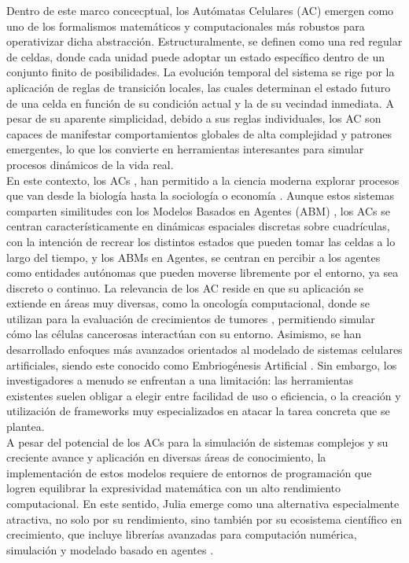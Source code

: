 \documentclass[runningheads]{llncs}
\begin{document}
Dentro de este marco concecptual, los Autómatas Celulares (AC) emergen como uno de los formalismos matemáticos y computacionales más robustos para operativizar dicha abstracción. Estructuralmente, se definen como una red regular de celdas, donde cada unidad puede adoptar un estado específico dentro de un conjunto finito de posibilidades. La evolución temporal del sistema se rige por la aplicación de reglas de transición locales, las cuales determinan el estado futuro de una celda en función de su condición actual y la de su vecindad inmediata. A pesar de su aparente simplicidad, debido a sus reglas individuales, los AC son capaces de manifestar comportamientos globales de alta complejidad y patrones emergentes, lo que los convierte en herramientas interesantes para simular procesos dinámicos de la vida real.\\

En este contexto, los ACs \cite{ref_ca}, han permitido a la ciencia moderna explorar procesos que van desde la biología \cite{ref_grow} hasta la sociología \cite{ref_societies, ref_epi} o economía \cite{ref_schelling, ref_economy}. Aunque estos sistemas comparten similitudes con los Modelos Basados en Agentes (ABM) \cite{ref_abm}, los ACs se centran característicamente en dinámicas espaciales discretas sobre cuadrículas, con la intención de recrear los distintos estados que pueden tomar las celdas a lo largo del tiempo, y los ABMs en Agentes, se centran en percibir a los agentes como entidades autónomas que pueden moverse libremente por el entorno, ya sea discreto o continuo. La relevancia de los AC reside en que su aplicación se extiende en áreas muy diversas, como la oncología computacional, donde se utilizan para la evaluación de crecimientos de tumores \cite{ref_tumor}, permitiendo simular cómo las células cancerosas interactúan con su entorno. Asimismo, se han desarrollado enfoques más avanzados orientados al modelado de sistemas celulares artificiales, siendo este conocido como Embriogénesis Artificial \cite{ref_sistema_celular, ref_embryogeny}. Sin embargo, los investigadores a menudo se enfrentan a una limitación: las herramientas existentes suelen obligar a elegir entre facilidad de uso o eficiencia, o la creación y utilización de frameworks muy especializados en atacar la tarea concreta que se plantea\cite{ref_greans}.\\

A pesar del potencial de los ACs para la simulación de sistemas complejos y su creciente avance y aplicación en diversas áreas de conocimiento, la implementación de estos modelos requiere de entornos de programación que logren equilibrar la expresividad matemática con un alto rendimiento computacional. En este sentido, Julia \cite{ref_julia} emerge como una alternativa especialmente atractiva, no solo por su rendimiento, sino también por su ecosistema científico en crecimiento, que incluye librerías avanzadas para computación numérica, simulación y modelado basado en agentes \cite{ref_agentsjl}.\\
\end{document}
